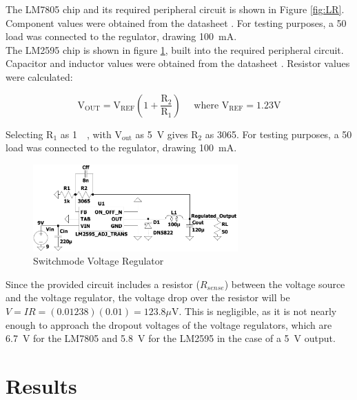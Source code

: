 The LM7805 chip and its required peripheral circuit is shown in Figure \ref{fig:LR}. Component values were obtained from the datasheet \cite{lm7805}. For testing purposes, a \SI{50}{\Omega} load was connected to the regulator, drawing \SI{100}{mA}.\\

The LM2595 chip is shown in figure \ref{fig:SM}, built into the required peripheral circuit. Capacitor and inductor values were obtained from the datasheet \cite{lm2595}. Resistor values were calculated:

$$\mathrm{V}_{\mathrm{OUT}}=\mathrm{V}_{\mathrm{REF}}\left(1+\frac{\mathrm{R}_{2}}{\mathrm{R}_{1}}\right) \quad \text { where } \mathrm{V}_{\mathrm{REF}}=1.23 \mathrm{V}$$

Selecting $\mathrm{R_1}$ as \SI{1}{\kilo\Omega}, with $\mathrm{V_{out}}$ as \SI{5}{\volt} gives $\mathrm{R_2}$ as \SI{3065}{\Omega}. For testing purposes, a \SI{50}{\Omega} load was connected to the regulator, drawing \SI{100}{mA}.\\
\pagebreak 

\begin{figure}
    \centering
    \includegraphics[width = 0.7\textwidth]{Figures/SM.pdf}
    \caption{Switchmode Voltage Regulator}
    \label{fig:SM}
\end{figure}

Since the provided circuit includes a resistor ($R_{sense}$) between the voltage source and the voltage regulator, the voltage drop over the resistor will be $V = IR = (0.01238)(0.01) = 123.8\mu \mathrm{V}$. This is negligible, as it is not nearly enough to approach the dropout voltages of the voltage regulators, which are \SI{6.7}{\volt} for the LM7805 and \SI{5.8}{\volt} for the LM2595 in the case of a \SI{5}{\volt} output.

\section{Results} \label{sec:volt_results}

